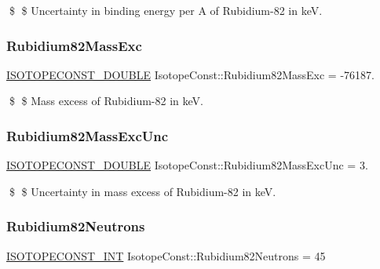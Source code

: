 \$ \$ Uncertainty in binding energy per A of Rubidium-\/82 in keV. \mbox{\label{group___isotope_const-_rubidium-_rb82_gaa96c9d52d10b8fff81966efb7a059a84}} 
\subsubsection{\texorpdfstring{Rubidium82\+Mass\+Exc}{Rubidium82MassExc}}
{\footnotesize\ttfamily \mbox{\hyperlink{group___isotope_const-_macros_ga8f45a7272ce02c0b4c65c44636ed719a}{I\+S\+O\+T\+O\+P\+E\+C\+O\+N\+S\+T\+\_\+\+D\+O\+U\+B\+LE}} Isotope\+Const\+::\+Rubidium82\+Mass\+Exc = -\/76187.}

\$ \$ Mass excess of Rubidium-\/82 in keV. \mbox{\label{group___isotope_const-_rubidium-_rb82_ga4ebb19a0f17305564aefd592a3076f50}} 
\subsubsection{\texorpdfstring{Rubidium82\+Mass\+Exc\+Unc}{Rubidium82MassExcUnc}}
{\footnotesize\ttfamily \mbox{\hyperlink{group___isotope_const-_macros_ga8f45a7272ce02c0b4c65c44636ed719a}{I\+S\+O\+T\+O\+P\+E\+C\+O\+N\+S\+T\+\_\+\+D\+O\+U\+B\+LE}} Isotope\+Const\+::\+Rubidium82\+Mass\+Exc\+Unc = 3.}

\$ \$ Uncertainty in mass excess of Rubidium-\/82 in keV. \mbox{\label{group___isotope_const-_rubidium-_rb82_ga1e4acf4877cdd658cad1b7e139d43b57}} 
\subsubsection{\texorpdfstring{Rubidium82\+Neutrons}{Rubidium82Neutrons}}
{\footnotesize\ttfamily \mbox{\hyperlink{group___isotope_const-_macros_ga5f18360b3e99483a35c32d789e62621c}{I\+S\+O\+T\+O\+P\+E\+C\+O\+N\+S\+T\+\_\+\+I\+NT}} Isotope\+Const\+::\+Rubidium82\+Neutrons = 45}


